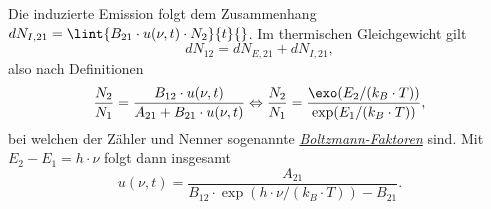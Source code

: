 \documentclass{article}
\begin{document}

    Die induzierte Emission folgt dem Zusammenhang $dN_{I,21} = \lint{B_{21}\cdot u(\nu, t)\cdot N_2}{t}{}$. Im thermischen Gleichgewicht gilt
    \[dN_{12} = dN_{E,21} + dN_{I,21},\]
    also nach Definitionen 
    \[\frac{N_2}{N_1} = \frac{B_{12}\cdot u(\nu,t)}{A_{21} + B_{21}\cdot u(\nu,t)} \Leftrightarrow \frac{N_2}{N_1} = \frac{\exo(E_2/(k_B\cdot T))}{\exp(E_1/(k_B\cdot T))},\]
    bei welchen der Zähler und Nenner sogenannte \href{https://de.wikipedia.org/wiki/Boltzmann-Statistik}{\emph{Boltzmann-Faktoren}} sind. Mit $E_2-E_1 = h\cdot\nu$ folgt dann insgesamt 
    \[u(\nu,t) = \frac{A_{21}}{B_{12}\cdot\exp(h\cdot\nu/(k_B\cdot T)) - B_{21}}.\]
\end{document}
